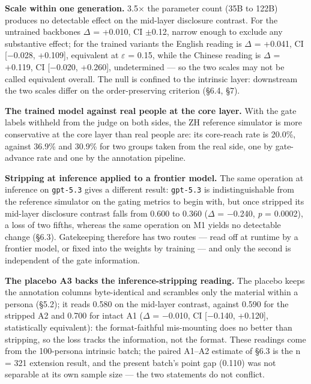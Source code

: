 \documentclass[letterpaper]{article}
\begin{document}
\textbf{Scale within one generation.} 3.5$\times$ the parameter count (35B to 122B) produces no detectable effect on the mid-layer disclosure contrast. For the untrained backbones $\Delta$ = +0.010, CI $\pm$0.12, narrow enough to exclude any substantive effect; for the trained variants the English reading is $\Delta$ = +0.041, CI [$-$0.028, +0.109], equivalent at $\varepsilon$ = 0.15, while the Chinese reading is $\Delta$ = +0.119, CI [$-$0.020, +0.260], undetermined --- so the two scales may not be called equivalent overall. The null is confined to the intrinsic layer: downstream the two scales differ on the order-preserving criterion (\S{}6.4, \S{}7).

\textbf{The trained model against real people at the core layer.} With the gate labels withheld from the judge on both sides, the ZH reference simulator is more conservative at the core layer than real people are: its core-reach rate is 20.0\%, against 36.9\% and 30.9\% for two groups taken from the real side, one by gate-advance rate and one by the annotation pipeline.

\textbf{Stripping at inference applied to a frontier model.} The same operation at inference on \texttt{gpt-5.3} gives a different result: \texttt{gpt-5.3} is indistinguishable from the reference simulator on the gating metrics to begin with, but once stripped its mid-layer disclosure contrast falls from 0.600 to 0.360 ($\Delta$ = $-$0.240, \textit{p} = 0.0002), a loss of two fifths, whereas the same operation on M1 yields no detectable change (\S{}6.3). Gatekeeping therefore has two routes --- read off at runtime by a frontier model, or fixed into the weights by training --- and only the second is independent of the gate information.

\textbf{The placebo A3 backs the inference-stripping reading.} The placebo keeps the annotation columns byte-identical and scrambles only the material within a persona (\S{}5.2); it reads 0.580 on the mid-layer contrast, against 0.590 for the stripped A2 and 0.700 for intact A1 ($\Delta$ = $-$0.010, CI [$-$0.140, +0.120], statistically equivalent): the format-faithful mis-mounting does no better than stripping, so the loss tracks the information, not the format. These readings come from the 100-persona intrinsic batch; the paired A1--A2 estimate of \S{}6.3 is the n = 321 extension result, and the present batch's point gap (0.110) was not separable at its own sample size --- the two statements do not conflict.
\end{document}
